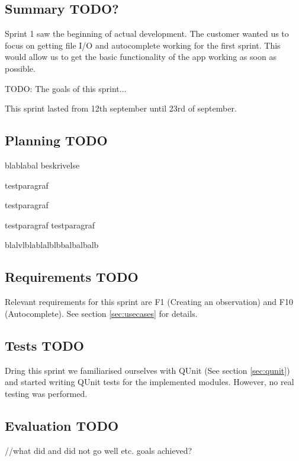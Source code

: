 \subsection{Summary TODO?}

	Sprint 1 saw the beginning of actual development. The customer wanted us to focus on getting file I/O and autocomplete working for the first sprint. This would allow us to get the basic functionality of the app working as soon as possible.
	
	TODO:
	The goals of this sprint...

	This sprint lasted from 12th september until 23rd of september.
 
\subsection{Planning TODO}
	blablabal beskrivelse

	testparagraf

	testparagraf

	testparagraf testparagraf

	blalvlblablalblbbalbalbalb

	

\subsection{Requirements TODO}

	Relevant requirements for this sprint are F1 (Creating an observation) and F10 (Autocomplete). See section \ref{sec:usecases} for details.

	

\subsection{Tests TODO}
	Dring this sprint we familiarised ourselves with QUnit (See section \ref{sec:qunit}) and started writing QUnit tests for the implemented modules. However, no real testing was performed.

\subsection{Evaluation TODO}
	//what did and did not go well etc. goals achieved?